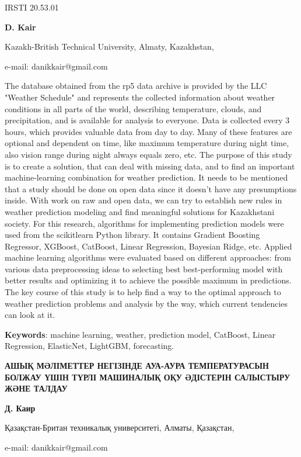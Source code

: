 IRSTI 20.53.01


\begin{center}
{\bfseries D. Kair}

Kazakh-British Technical University, Almaty, Kazakhstan,

e-mail: danikkair@gmail.com
\end{center}

The database obtained from the rp5 data archive is provided by the LLC
"Weather Schedule" and represents the collected information about
weather conditions in all parts of the world, describing temperature,
clouds, and precipitation, and is available for analysis to everyone.
Data is collected every 3 hours, which provides valuable data from day
to day. Many of these features are optional and dependent on time, like
maximum temperature during night time, also vision range during night
always equals zero, etc. The purpose of this study is to create a
solution, that can deal with missing data, and to find an important
machine-learning combination for weather prediction. It needs to be
mentioned that a study should be done on open data since it doesn't have
any presumptions inside. With work on raw and open data, we can try to
establish new rules in weather prediction modeling and find meaningful
solutions for Kazakhstani society. For this research, algorithms for
implementing prediction models were used from the scikitlearn Python
library. It contains Gradient Boosting Regressor, XGBoost, CatBoost,
Linear Regression, Bayesian Ridge, etc. Applied machine learning
algorithms were evaluated based on different approaches: from various
data preprocessing ideas to selecting best best-performing model with
better results and optimizing it to achieve the possible maximum in
predictions. The key course of this study is to help find a way to the
optimal approach to weather prediction problems and analysis by the way,
which current tendencies can look at it.

{\bfseries Keywords}: machine learning, weather, prediction model,
CatBoost, Linear Regression, ElasticNet, LightGBM, forecasting.

\begin{center}
{\large\bfseries АШЫҚ МӘЛІМЕТТЕР НЕГІЗІНДЕ АУА-АУРА ТЕМПЕРАТУРАСЫН БОЛЖАУ ҮШІН
ТҮРЛІ МАШИНАЛЫҚ ОҚУ ӘДІСТЕРІН САЛЫСТЫРУ ЖӘНЕ ТАЛДАУ}

{\bfseries Д. Каир}

Қазақстан-Британ техникалық университеті, Алматы, Қазақстан,

e-mail: danikkair@gmail.com
\end{center}

